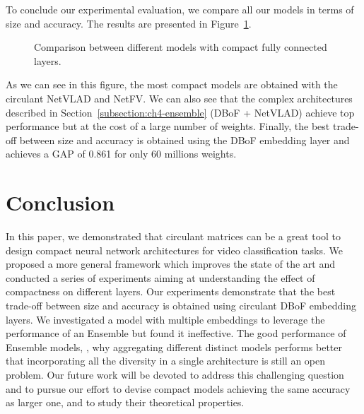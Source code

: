 To conclude our experimental evaluation, we compare all our models in terms of size and accuracy.
The results are presented in Figure~\ref{figure:ch4-models}. 

\begin{figure}[htb]
  \centering
  
  \caption{Comparison between different models with compact fully connected layers.}
  \label{figure:ch4-models}
\end{figure}

As we can see in this figure, the most compact models are obtained with the circulant NetVLAD and NetFV.
We can also see that the complex architectures described in Section~\ref{subsection:ch4-ensemble} (DBoF + NetVLAD) achieve top performance but at the cost of a large number of weights.
Finally, the best trade-off between size and accuracy is obtained using the DBoF embedding layer and achieves a GAP of 0.861 for only 60 millions weights.


\section{Conclusion}

In this paper, we demonstrated that circulant matrices can be a great tool to design compact neural network architectures for video classification tasks.
We proposed a more general framework which improves the state of the art and conducted a series of experiments aiming at understanding the effect of compactness on different layers.
Our experiments demonstrate that the best trade-off between size and accuracy is obtained using circulant DBoF embedding layers.
We investigated a model with multiple embeddings to leverage the performance of an Ensemble but found it ineffective.
The good performance of Ensemble models, \ie, why aggregating different distinct models performs better that incorporating all the diversity in a single architecture is still an open problem.
Our future work will be devoted to address this challenging question and to pursue our effort to devise compact models achieving the same accuracy as larger one, and to study their theoretical properties.

